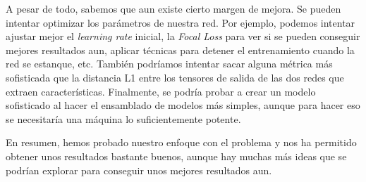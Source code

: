 \documentclass[11pt,a4paper]{article}
\begin{document}
A pesar de todo, sabemos que aun existe cierto margen de mejora. Se pueden intentar optimizar los parámetros de nuestra
red. Por ejemplo, podemos intentar ajustar mejor el \textit{learning rate} inicial, la \textit{Focal Loss} para ver si se
pueden conseguir mejores resultados aun, aplicar técnicas para detener el entrenamiento cuando la red se estanque, etc.
También podríamos intentar sacar alguna métrica más sofisticada que la distancia L1 entre los tensores de salida de las
dos redes que extraen características. Finalmente, se podría probar a crear un modelo sofisticado al hacer el ensamblado
de modelos más simples, aunque para hacer eso se necesitaría una máquina lo suficientemente potente.

En resumen, hemos probado nuestro enfoque con el problema y nos ha permitido obtener unos resultados bastante buenos,
aunque hay muchas más ideas que se podrían explorar para conseguir unos mejores resultados aun.

\newpage

\printbibliography
\end{document}
